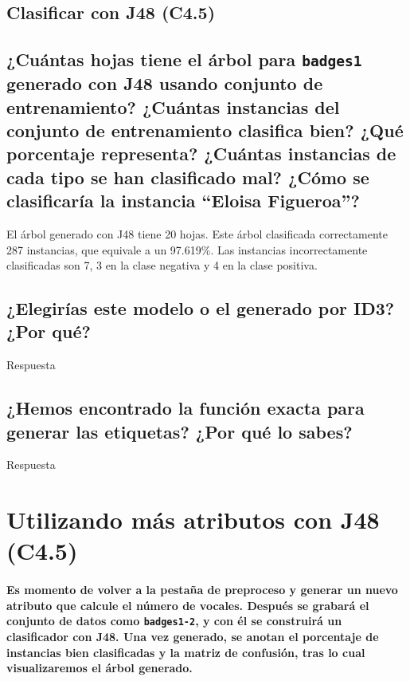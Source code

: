 \documentclass[12pt]{article}
\begin{document}
\newpage

\begin{center}
\section{Clasificar con J48 (C4.5)}
\end{center}

\subsection*{\small ¿Cuántas hojas tiene el árbol para \texttt{badges1}
generado con J48 usando conjunto de entrenamiento? ¿Cuántas instancias del
conjunto de entrenamiento clasifica bien? ¿Qué porcentaje representa? ¿Cuántas
instancias de cada tipo se han clasificado mal? ¿Cómo se clasificaría la
instancia ``Eloisa Figueroa''?}

El árbol generado con J48 tiene 20 hojas. Este árbol clasificada correctamente
287 instancias, que equivale a un 97.619\%. Las instancias incorrectamente
clasificadas son 7, 3 en la clase negativa y 4 en la clase positiva.

\subsection*{\small ¿Elegirías este modelo o el generado por ID3? ¿Por qué?}

Respuesta

\subsection*{\small ¿Hemos encontrado la función exacta para generar las
etiquetas? ¿Por qué lo sabes?}

Respuesta

\newpage

\section{Utilizando más atributos con J48 (C4.5)}

\paragraph{\small Es momento de volver a la pestaña de preproceso y generar un
nuevo atributo que calcule el número de vocales. Después se grabará el conjunto
de datos como \texttt{badges1-2}, y con él se construirá un clasificador
con J48. Una vez generado, se anotan el porcentaje de instancias bien
clasificadas y la matriz de confusión, tras lo cual visualizaremos el árbol
generado.}
\end{document}
